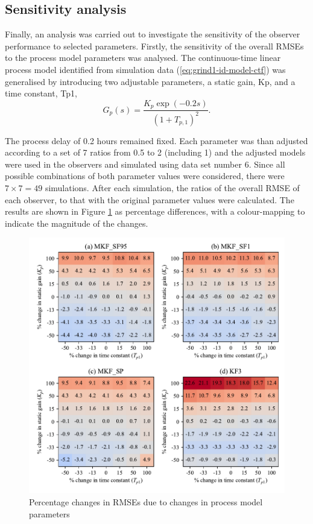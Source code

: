 \subsection{Sensitivity analysis} \label{sec:grind1-sensitivity-analysis}
Finally, an analysis was carried out to investigate the sensitivity of the observer performance to selected parameters. Firstly, the sensitivity of the overall \gls{RMSE}s to the process model parameters was analysed. The continuous-time linear process model identified from simulation data (\ref{eq:grind1-id-model-ctf}) was generalised by introducing two adjustable parameters, a static gain, \gls{Kp}, and a time constant, \gls{Tp1},
\begin{equation} \label{eq:grind1-id-model-ctf}
	G_p(s)= \frac{K_p \exp(-0.2s)}{(1 + T_{p,1})^2}.
\end{equation}

The process delay of 0.2 hours remained fixed. Each parameter was than adjusted according to a set of 7 ratios from 0.5 to 2 (including 1) and the adjusted models were used in the observers and simulated using data set number 6. Since all possible combinations of both parameter values were considered, there were $7\times7=49$ simulations. After each simulation, the ratios of the overall \gls{RMSE} of each observer, to that with the original parameter values were calculated. The results are shown in Figure \ref{fig:grind1-obs-sim-sens-model-y-est} as percentage differences, with a colour-mapping to indicate the magnitude of the changes.
\begin{figure}[htp]
	\centering
	\includegraphics[width=15cm]{images/rod_obs_sim_sens_sys_4obs_RMSE_y_est.pdf}
	\caption{Percentage changes in RMSEs due to changes in process model parameters}
	\label{fig:grind1-obs-sim-sens-model-y-est}
\end{figure}

